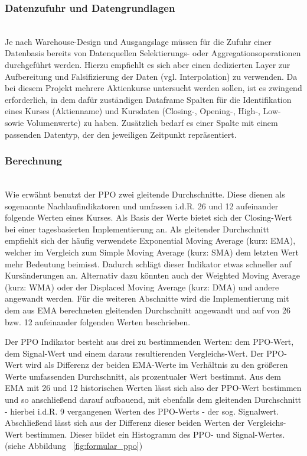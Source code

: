 \subsubsection{Datenzufuhr und Datengrundlagen\nopunct}~\\
\label{subsec_datenbase_ppo}Je nach Warehouse-Design und Ausgangslage müssen für die Zufuhr einer Datenbasis bereits von Datenquellen Selektierungs- oder Aggregationsoperationen durchgeführt werden. Hierzu empfiehlt es sich aber einen dedizierten Layer zur Aufbereitung und Falsifizierung der Daten (vgl. Interpolation) zu verwenden. 
Da bei diesem Projekt mehrere Aktienkurse untersucht werden sollen, ist es zwingend erforderlich, in dem dafür zuständigen Dataframe Spalten für die Identifikation eines Kurses (Aktienname) und Kursdaten (Closing-, Opening-,  High-, Low- sowie Volumenwerte) zu haben. Zusätzlich bedarf es einer Spalte mit einem passenden Datentyp, der den jeweiligen Zeitpunkt repräsentiert.

\subsubsection{Berechnung\nopunct}~\\
\label{subsec_berrechnung_ppo}Wie erwähnt benutzt der PPO zwei gleitende Durchschnitte. Diese dienen als sogenannte Nachlaufindikatoren und umfassen i.d.R. 26 und 12 aufeinander folgende Werten eines Kurses. Als Basis der Werte bietet sich der Closing-Wert bei einer tagesbasierten Implementierung an. Als gleitender Durchschnitt empfiehlt sich der häufig verwendete Exponential Moving Average (kurz: EMA), welcher im Vergleich zum Simple Moving Average (kurz: SMA) dem letzten Wert mehr Bedeutung beimisst. Dadurch schlägt dieser Indikator etwas schneller auf Kursänderungen an. Alternativ dazu könnten auch der Weighted Moving Average (kurz: WMA) oder der Displaced Moving Average (kurz: DMA) und andere angewandt werden. Für die weiteren Abschnitte wird die Implementierung mit dem aus EMA berechneten gleitenden Durchschnitt angewandt und auf von 26 bzw. 12 aufeinander folgenden Werten beschrieben. \cite{tvWikiPpo,inoPedPpo,inoPedEma}

Der PPO Indikator besteht aus drei zu bestimmenden Werten: dem PPO-Wert, dem Signal-Wert und einem daraus resultierenden Vergleichs-Wert. Der PPO-Wert wird als Differenz der beiden EMA-Werte im Verhältnis zu den größeren Werte umfassenden Durchschnitt, als prozentualer Wert bestimmt. Aus dem EMA mit 26 und 12 historischen Werten lässt sich also der PPO-Wert bestimmen und so anschließend darauf aufbauend, mit ebenfalls dem gleitenden Durchschnitt - hierbei i.d.R. 9 vergangenen Werten des PPO-Werts - der sog. Signalwert. Abschließend lässt sich aus der Differenz dieser beiden Werten der Vergleichs-Wert bestimmen. Dieser bildet ein Histogramm des PPO- und Signal-Wertes. (siehe Abbildung ~\ref{fig:formular_ppo}) \cite{tvWikiPpo,inoPedPpo}

